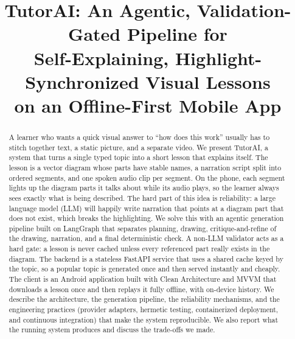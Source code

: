 \documentclass[conference]{IEEEtran}
\begin{document}
\title{TutorAI: An Agentic, Validation-Gated Pipeline for\\
Self-Explaining, Highlight-Synchronized Visual Lessons\\
on an Offline-First Mobile App}

\author{
\and
{}
}

\maketitle

\begin{abstract}
A learner who wants a quick visual answer to ``how does this work'' usually
has to stitch together text, a static picture, and a separate video. We
present TutorAI, a system that turns a single typed topic into a short lesson
that explains itself. The lesson is a vector diagram whose parts have stable
names, a narration script split into ordered segments, and one spoken audio
clip per segment. On the phone, each segment lights up the diagram parts it
talks about while its audio plays, so the learner always sees exactly what is
being described. The hard part of this idea is reliability: a large language
model (LLM) will happily write narration that points at a diagram part that
does not exist, which breaks the highlighting. We solve this with an agentic
generation pipeline built on LangGraph that separates planning, drawing,
critique-and-refine of the drawing, narration, and a final deterministic
check. A non-LLM validator acts as a hard gate: a lesson is never cached
unless every referenced part really exists in the diagram. The backend is a
stateless FastAPI service that uses a shared cache keyed by the topic, so a
popular topic is generated once and then served instantly and cheaply. The
client is an Android application built with Clean Architecture and MVVM that
downloads a lesson once and then replays it fully offline, with on-device
history. We describe the architecture, the generation pipeline, the
reliability mechanisms, and the engineering practices (provider adapters,
hermetic testing, containerized deployment, and continuous integration) that
make the system reproducible. We also report what the running system produces
and discuss the trade-offs we made.
\end{abstract}
\end{document}
